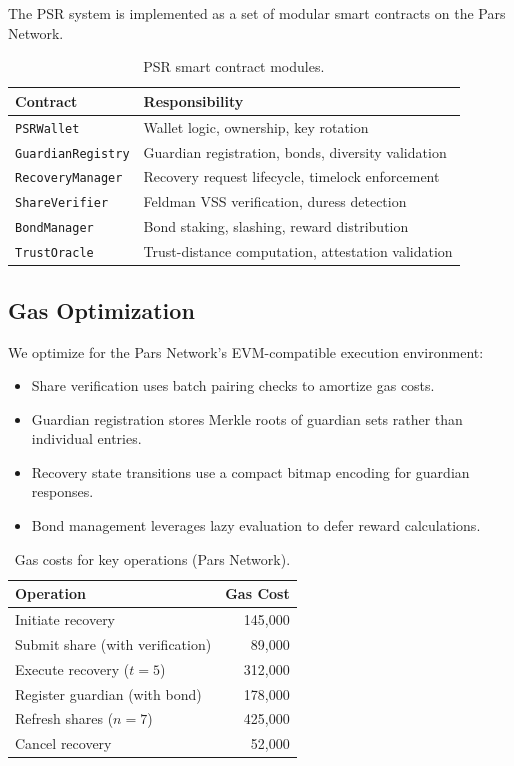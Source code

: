 \documentclass[11pt,a4paper,twocolumn]{article}
\begin{document}
The PSR system is implemented as a set of modular smart contracts on the Pars Network.

\begin{table}[H]
\centering
\caption{PSR smart contract modules.}
\label{tab:contracts}
\begin{tabular}{@{}lp{4.5cm}@{}}
\toprule
\textbf{Contract} & \textbf{Responsibility} \\
\midrule
\texttt{PSRWallet} & Wallet logic, ownership, key rotation \\
\texttt{GuardianRegistry} & Guardian registration, bonds, diversity validation \\
\texttt{RecoveryManager} & Recovery request lifecycle, timelock enforcement \\
\texttt{ShareVerifier} & Feldman VSS verification, duress detection \\
\texttt{BondManager} & Bond staking, slashing, reward distribution \\
\texttt{TrustOracle} & Trust-distance computation, attestation validation \\
\bottomrule
\end{tabular}
\end{table}

\subsection{Gas Optimization}

We optimize for the Pars Network's EVM-compatible execution environment:

\begin{itemize}
  \item Share verification uses batch pairing checks to amortize gas costs.
  \item Guardian registration stores Merkle roots of guardian sets rather than individual entries.
  \item Recovery state transitions use a compact bitmap encoding for guardian responses.
  \item Bond management leverages lazy evaluation to defer reward calculations.
\end{itemize}

\begin{table}[H]
\centering
\caption{Gas costs for key operations (Pars Network).}
\label{tab:gas}
\begin{tabular}{@{}lr@{}}
\toprule
\textbf{Operation} & \textbf{Gas Cost} \\
\midrule
Initiate recovery & 145,000 \\
Submit share (with verification) & 89,000 \\
Execute recovery ($t = 5$) & 312,000 \\
Register guardian (with bond) & 178,000 \\
Refresh shares ($n = 7$) & 425,000 \\
Cancel recovery & 52,000 \\
\bottomrule
\end{tabular}
\end{table}
\end{document}
